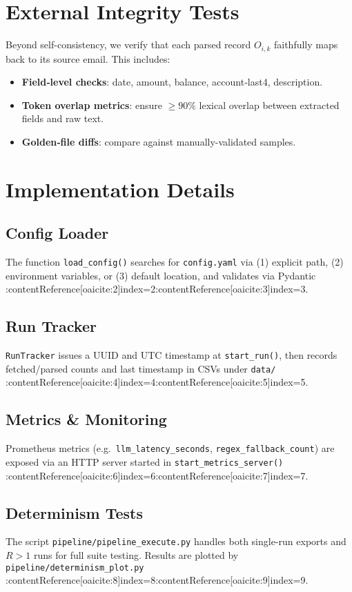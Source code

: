 \documentclass{report}
\begin{document}
	\section{External Integrity Tests}
	Beyond self-consistency, we verify that each parsed record $O_{i,k}$ faithfully maps back to its source email.  This includes:
	\begin{itemize}
		\item \textbf{Field‐level checks}: date, amount, balance, account‐last4, description.
		\item \textbf{Token overlap metrics}: ensure $\geq90\%$ lexical overlap between extracted fields and raw text.
		\item \textbf{Golden‐file diffs}: compare against manually-validated samples.
	\end{itemize}
	
	\section{Implementation Details}
	\subsection{Config Loader}
	The function \texttt{load\_config()} searches for \texttt{config.yaml} via (1) explicit path, (2) environment variables, or (3) default location, and validates via Pydantic :contentReference[oaicite:2]{index=2}:contentReference[oaicite:3]{index=3}.
	
	\subsection{Run Tracker}
	\texttt{RunTracker} issues a UUID and UTC timestamp at \texttt{start\_run()}, then records fetched/parsed counts and last timestamp in CSVs under \texttt{data/} :contentReference[oaicite:4]{index=4}:contentReference[oaicite:5]{index=5}.
	
	\subsection{Metrics \& Monitoring}
	Prometheus metrics (e.g.\ \texttt{llm\_latency\_seconds}, \texttt{regex\_fallback\_count}) are exposed via an HTTP server started in \texttt{start\_metrics\_server()} :contentReference[oaicite:6]{index=6}:contentReference[oaicite:7]{index=7}.
	
	\subsection{Determinism Tests}
	The script \texttt{pipeline/pipeline\_execute.py} handles both single-run exports and $R>1$ runs for full suite testing.  Results are plotted by \texttt{pipeline/determinism\_plot.py} :contentReference[oaicite:8]{index=8}:contentReference[oaicite:9]{index=9}.
	
\end{document}
